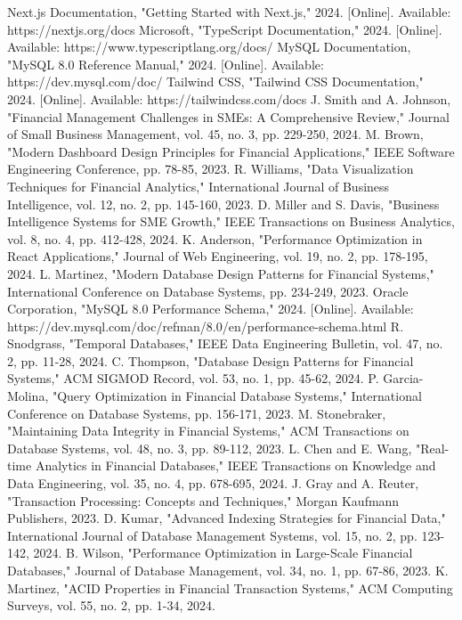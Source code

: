 \documentclass[conference]{IEEEtran}
\begin{document}
\begin{thebibliography}{00}
 Next.js Documentation, "Getting Started with Next.js," 2024. [Online]. Available: https://nextjs.org/docs
 Microsoft, "TypeScript Documentation," 2024. [Online]. Available: https://www.typescriptlang.org/docs/
 MySQL Documentation, "MySQL 8.0 Reference Manual," 2024. [Online]. Available: https://dev.mysql.com/doc/
 Tailwind CSS, "Tailwind CSS Documentation," 2024. [Online]. Available: https://tailwindcss.com/docs
 J. Smith and A. Johnson, "Financial Management Challenges in SMEs: A Comprehensive Review," Journal of Small Business Management, vol. 45, no. 3, pp. 229-250, 2024.
 M. Brown, "Modern Dashboard Design Principles for Financial Applications," IEEE Software Engineering Conference, pp. 78-85, 2023.
 R. Williams, "Data Visualization Techniques for Financial Analytics," International Journal of Business Intelligence, vol. 12, no. 2, pp. 145-160, 2023.
 D. Miller and S. Davis, "Business Intelligence Systems for SME Growth," IEEE Transactions on Business Analytics, vol. 8, no. 4, pp. 412-428, 2024.
 K. Anderson, "Performance Optimization in React Applications," Journal of Web Engineering, vol. 19, no. 2, pp. 178-195, 2024.
 L. Martinez, "Modern Database Design Patterns for Financial Systems," International Conference on Database Systems, pp. 234-249, 2023.
 Oracle Corporation, "MySQL 8.0 Performance Schema," 2024. [Online]. Available: https://dev.mysql.com/doc/refman/8.0/en/performance-schema.html
 R. Snodgrass, "Temporal Databases," IEEE Data Engineering Bulletin, vol. 47, no. 2, pp. 11-28, 2024.
 C. Thompson, "Database Design Patterns for Financial Systems," ACM SIGMOD Record, vol. 53, no. 1, pp. 45-62, 2024.
 P. Garcia-Molina, "Query Optimization in Financial Database Systems," International Conference on Database Systems, pp. 156-171, 2023.
 M. Stonebraker, "Maintaining Data Integrity in Financial Systems," ACM Transactions on Database Systems, vol. 48, no. 3, pp. 89-112, 2023.
 L. Chen and E. Wang, "Real-time Analytics in Financial Databases," IEEE Transactions on Knowledge and Data Engineering, vol. 35, no. 4, pp. 678-695, 2024.
 J. Gray and A. Reuter, "Transaction Processing: Concepts and Techniques," Morgan Kaufmann Publishers, 2023.
 D. Kumar, "Advanced Indexing Strategies for Financial Data," International Journal of Database Management Systems, vol. 15, no. 2, pp. 123-142, 2024.
 B. Wilson, "Performance Optimization in Large-Scale Financial Databases," Journal of Database Management, vol. 34, no. 1, pp. 67-86, 2023.
 K. Martinez, "ACID Properties in Financial Transaction Systems," ACM Computing Surveys, vol. 55, no. 2, pp. 1-34, 2024.
\end{thebibliography}
\end{document}
